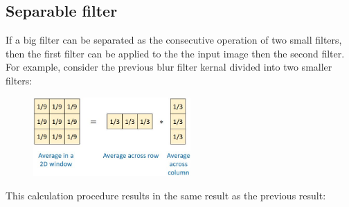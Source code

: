 \documentclass{report}
\begin{document}
\subsection{Separable filter}

If a big filter can be separated as the consecutive operation of two small
filters, then the first filter can be applied to the the input image then the
second filter. For example, consider the previous blur filter kernal divided
into two smaller filters:
\begin{figure}[h]
    \centering
    \includegraphics[width=6cm]{Blur separable filter.JPG}
\end{figure}

This calculation procedure results in the same result as the previous result:

\begin{minipage}{7in}
    \centering
    \hspace*{.2in}
\end{minipage}
\end{document}
